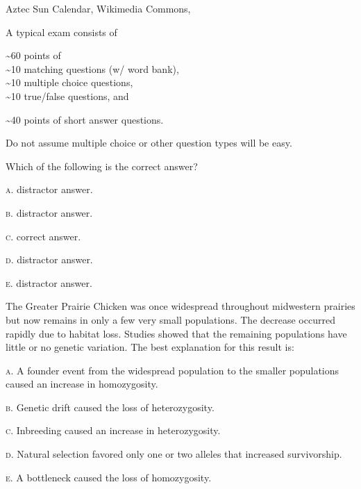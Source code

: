 \documentclass[t]{beamer}
\begin{document}
{
\begin{frame}[b]

\hfill \tiny Aztec Sun Calendar, Wikimedia Commons, 
\end{frame}
}


\begin{frame}{A typical exam consists of}

	\hangpara \textasciitilde60 points of\\
	\quad \textasciitilde10 matching questions (w/ word bank),\\
	\quad \textasciitilde10 multiple choice questions, \\
	\quad \textasciitilde10 true/false questions, and 
	
	\hangpara \textasciitilde40 points of short answer questions.
	
	\hangpara {}
\end{frame}
%

\begin{frame}{Do not assume multiple choice or other question types will be easy.}

\hangpara Which of the following is the correct answer?

\hangpara \quad \textsc{a.} distractor answer.

\hangpara \quad \textsc{b.} distractor answer.

\hangpara \quad \textsc{c.} correct answer.

\hangpara \quad \textsc{d.} distractor answer.

\hangpara \quad \textsc{e.} distractor answer.


\end{frame}

\begin{frame}

The Greater Prairie Chicken was once widespread throughout midwestern prairies but now remains in only a few very small populations. The decrease occurred rapidly due to habitat loss. Studies showed that the remaining populations have little or no genetic variation. The best explanation for this result is:


\hangpara \textsc{a.} A founder event from the widespread population to the smaller populations caused an increase in homozygosity.

\hangpara \textsc{b.} Genetic drift caused the loss of heterozygosity. 

\hangpara \textsc{c.} Inbreeding caused an increase in heterozygosity. 

\hangpara \textsc{d.} Natural selection favored only one or two alleles that increased survivorship.

\hangpara \textsc{e.} A bottleneck caused the loss of homozygosity. %

\end{frame}
\end{document}
